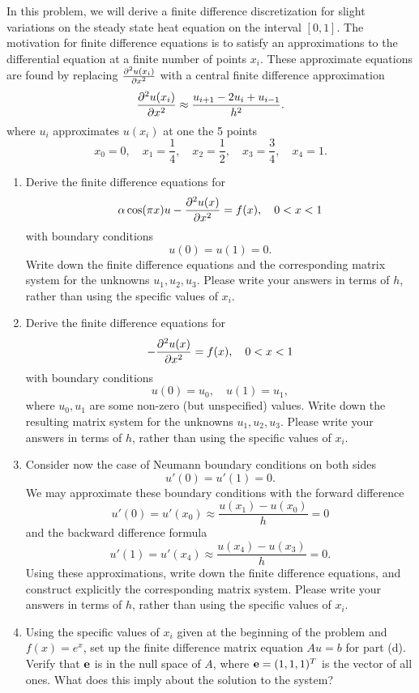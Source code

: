 In this problem, we will derive a finite difference discretization for slight variations on the steady state heat equation on the interval $[0,1]$.  The motivation for finite difference equations is to satisfy an approximations to the differential equation at a finite number of points $x_i$.  These approximate equations are found by replacing $\frac{\partial^{2} u(x_i)}{\partial x^{2}}$ with a central finite difference approximation
\[
\frac{\partial^{2} u(x_i)}{\partial x^{2}} \approx \frac{ u_{i+1} - 2u_i + u_{i-1}}{h^2}.
\]
where $u_i$ approximates $u(x_i)$ at one the 5 points 
\[
x_0 = 0, \quad x_1 = \frac{1}{4}, \quad x_2 = \frac{1}{2}, \quad x_3 = \frac{3}{4}, \quad x_4 = 1.
\]
\begin{enumerate}
\item Derive the finite difference equations for 
\[
\alpha \cos(\pi x) u - \frac{\partial^{2} u(x)}{\partial x^{2}} = f(x), \quad 0<x<1
\]
with boundary conditions 
\[
u(0) = u(1) = 0.
\]
Write down the finite difference equations and the corresponding matrix system for the unknowns $u_1, u_2, u_3$.  Please write your answers in terms of $h$, rather than using the specific values of $x_i$.
\vspace{1em}
\item Derive the finite difference equations for 
\[
- \frac{\partial^{2} u(x)}{\partial x^{2}} = f(x), \quad 0<x<1
\]
with boundary conditions 
\[
u(0) = u_0, \quad u(1) = u_1,
\]
where $u_0, u_1$ are some non-zero (but unspecified) values.  Write down the resulting matrix system for the unknowns $u_1, u_2, u_3$.  Please write your answers in terms of $h$, rather than using the specific values of $x_i$.
\vspace{1em}
\item Consider now the case of Neumann boundary conditions on both sides
\[
u'(0) = u'(1) = 0.
\]
We may approximate these boundary conditions with the forward difference
\[
u'(0) = u'(x_0) \approx \frac{u(x_1)-u(x_0)}{h} = 0
\]
and the backward difference formula
\[
u'(1) = u'(x_{4}) \approx \frac{u(x_{4})-u(x_3)}{h} = 0.
\]
Using these approximations, write down the finite difference equations, and construct explicitly the corresponding matrix system.  Please write your answers in terms of $h$, rather than using the specific values of $x_i$.
\item Using the specific values of $x_i$ given at the beginning of the problem and $f(x) = e^x$, set up the finite difference matrix equation $Au=b$ for part (d).  Verify that ${\bf e}$ is in the null space of ${A}$, where ${\bf e} = (1,1,1)^T$ is the vector of all ones.  What does this imply about the solution to the system?  
\end{enumerate}


